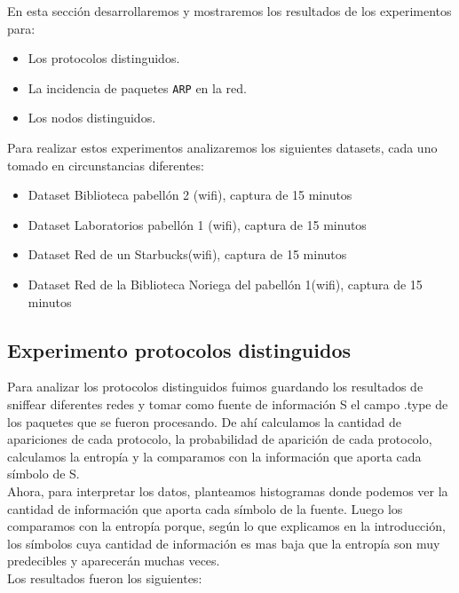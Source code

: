 En esta sección desarrollaremos y mostraremos los resultados de los experimentos para:

\begin{itemize}
\item Los protocolos distinguidos.
\item La incidencia de paquetes \texttt{ARP} en la red.
\item Los nodos distinguidos.
\end{itemize}

Para realizar estos experimentos analizaremos los siguientes datasets, cada uno tomado en circunstancias diferentes:

\begin{itemize}
\item Dataset Biblioteca pabellón 2 (wifi), captura de 15 minutos
\item Dataset Laboratorios pabellón 1 (wifi), captura de 15 minutos
\item Dataset Red de un Starbucks(wifi), captura de 15 minutos
\item Dataset Red de la Biblioteca Noriega del pabellón 1(wifi), captura de 15 minutos
\end{itemize}


\subsection{Experimento protocolos distinguidos}

Para analizar los protocolos distinguidos fuimos guardando los resultados de sniffear diferentes redes y tomar como fuente de información S el campo .type de los paquetes que se fueron procesando. De ahí calculamos la cantidad de apariciones de cada protocolo, la probabilidad de aparición de cada protocolo, calculamos la entropía y la comparamos con la información que aporta cada símbolo de S.\\

Ahora, para interpretar los datos, planteamos histogramas donde podemos ver la cantidad de información que aporta cada símbolo de la fuente. Luego los comparamos con la entropía porque, según lo que explicamos en la introducción, los símbolos cuya cantidad de información es mas baja que la entropía son muy predecibles y aparecerán muchas veces. \\

Los resultados fueron los siguientes: \\


